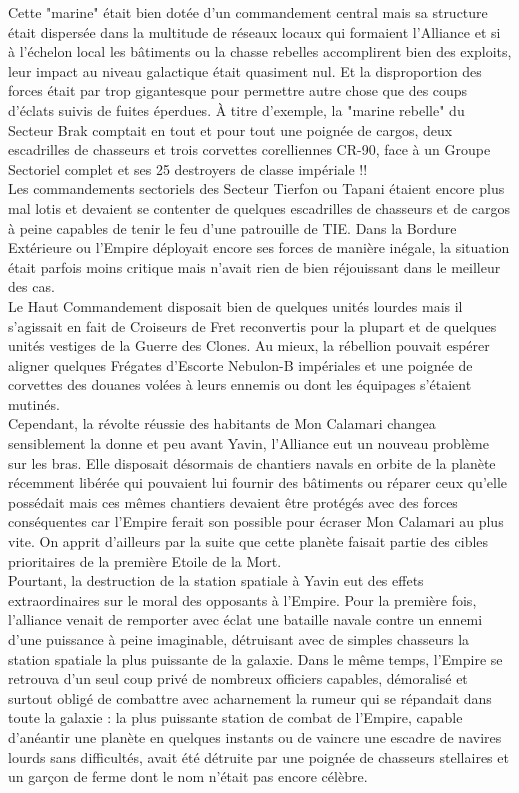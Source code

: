 \documentclass[twoside]{article}
\begin{document}
Cette "marine" était bien dotée d'un commandement central mais sa structure était dispersée dans la multitude de réseaux locaux qui formaient l'Alliance et si à l'échelon local les bâtiments ou la chasse rebelles accomplirent bien des exploits, leur impact au niveau galactique était quasiment nul. Et la disproportion des forces était par trop gigantesque pour permettre autre chose que des coups d'éclats suivis de fuites éperdues. À titre d'exemple, la "marine rebelle" du Secteur Brak comptait en tout et pour tout une poignée de cargos, deux escadrilles de chasseurs et trois corvettes corelliennes CR-90, face à un Groupe Sectoriel complet et ses 25 destroyers de classe impériale !!\\

Les commandements sectoriels des  Secteur Tierfon ou Tapani étaient encore plus mal lotis et devaient se contenter de quelques escadrilles de chasseurs et de cargos à peine capables de tenir le feu d'une patrouille de TIE. Dans la Bordure Extérieure ou l'Empire déployait encore ses forces de manière inégale, la situation était parfois moins critique mais n'avait rien de bien réjouissant dans le meilleur des cas.\\

Le Haut Commandement disposait bien de quelques unités lourdes mais il s'agissait en fait de Croiseurs de Fret reconvertis pour la plupart et de quelques unités vestiges de la Guerre des Clones. Au mieux, la rébellion pouvait espérer aligner quelques Frégates d'Escorte Nebulon-B impériales et une poignée de corvettes des douanes volées à leurs ennemis ou dont les équipages s'étaient mutinés.\\

Cependant, la révolte réussie des habitants de Mon Calamari changea sensiblement la donne et peu avant Yavin, l'Alliance eut un nouveau problème sur les bras. Elle disposait désormais de chantiers navals en orbite de la planète récemment libérée qui pouvaient lui fournir des bâtiments ou réparer ceux qu'elle possédait mais ces mêmes chantiers devaient être protégés avec des forces conséquentes car l'Empire ferait son possible pour écraser Mon Calamari au plus vite. On apprit d'ailleurs par la suite que cette planète faisait partie des cibles prioritaires de la première Etoile de la Mort.\\

Pourtant, la destruction de la station spatiale à Yavin eut des effets extraordinaires sur le moral des opposants à l'Empire. Pour la première fois, l'alliance venait de remporter avec éclat une bataille navale contre un ennemi d'une puissance à peine imaginable, détruisant avec de simples chasseurs la station spatiale la plus puissante de la galaxie. Dans le même temps, l'Empire se retrouva d'un seul coup privé de nombreux officiers capables, démoralisé et surtout obligé de combattre avec acharnement la rumeur qui se répandait dans toute la galaxie : la plus puissante station de combat de l'Empire, capable d'anéantir une planète en quelques instants ou de vaincre une escadre de navires lourds sans difficultés, avait été détruite par une poignée de chasseurs stellaires et un garçon de ferme dont le nom n'était pas encore célèbre.\\
\end{document}
